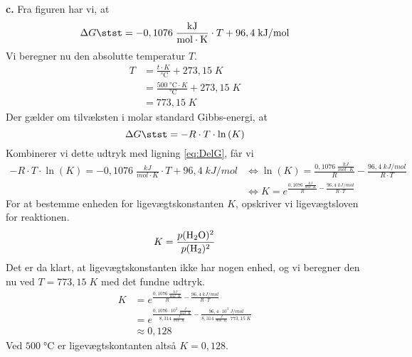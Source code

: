 \documentclass{report}
\begin{document}
\textbf{c.}
Fra figuren har vi, at 
\begin{equation}
\begin{split}
\Delta G \stst =-0,1076 \;\unit{\frac{kJ}{mol \cdot K}} \cdot T +96,4 \;\unit{kJ/mol} 
\end{split}
\label{eq:DelG}
\end{equation}
Vi beregner nu den absolutte temperatur $T$.
\begin{equation*}
\begin{split}
  T&=\frac{t \cdot K}{\;\unit{\celsius} } + 273,15 \;\unit{K} \\
  &=\frac{500 \;\unit{\celsius} \cdot K}{\;\unit{\celsius} } + 273,15 \;\unit{K} \\
  &=773,15 \;\unit{K} 
\end{split}
\end{equation*}
Der gælder om tilvæksten i molar standard Gibbs-energi, at
\[
\Delta G \stst = -R \cdot T \cdot \ln\left(K\right) 
\] 
Kombinerer vi dette udtryk med ligning \ref{eq:DelG}, får vi 
\begin{equation}
\begin{split}
  -R \cdot T \cdot \ln\left(K\right) = -0,1076 \;\unit{\frac{kJ}{mol \cdot K}}  \cdot T + 96,4 \;\unit{kJ/mol} &\iff \ln\left(K\right) = \frac{0,1076 \;\unit{\frac{kJ}{mol \cdot K}} }{R} - \frac{96,4 \;\unit{kJ/mol} }{R \cdot T}\\
  &\iff K = e^{\frac{0,1076 \;\unit{\frac{kJ}{mol \cdot K}} }{R} - \frac{96,4 \;\unit{kJ/mol} }{R \cdot T}} 
\end{split}
\label{eq:K}
\end{equation}
For at bestemme enheden for ligevægtskonstanten $K$, opskriver vi ligevægtsloven for reaktionen.
\begin{equation*}
\begin{split}
  K=\frac{p(\ce{H2O})^2}{p(\ce{H2} )^2}
\end{split}
\end{equation*}
Det er da klart, at ligevægtskonstanten ikke har nogen enhed, og vi beregner den nu ved $T=773,15 \;\unit{K} $ med det fundne udtryk.
\begin{equation*}
\begin{split}
  K &= e^{\frac{0,1076 \;\unit{\frac{kJ}{mol \cdot K}} }{R} - \frac{96,4 \;\unit{kJ/mol} }{R \cdot T}}\\
  &=e^{\frac{0,1076 \cdot 10^3\;\unit{\frac{J}{mol \cdot K}} }{8,314 \;\unit{\frac{J}{mol \cdot K}} } - \frac{96,4 \cdot 10^3\;\unit{J/mol} }{8,314 \;\unit{\frac{J}{mol \cdot K}}  \cdot 773,15 \;\unit{K} }}\\
  &\approx 0,128
\end{split}
\end{equation*}
Ved $500 \;\unit{\celsius} $ er ligevægtskontanten altså $K=0,128$. 
\end{document}
